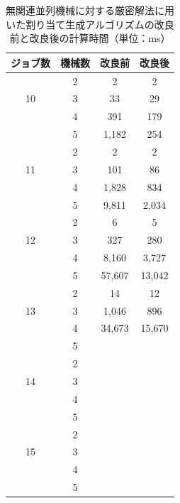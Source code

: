 \documentclass[12pt]{optlab-bachelor}
\begin{document}
\begin{table}[htb]
  \begin{center}
    \begin{tabular}{|c|c|c|c|} \hline
      ジョブ数 & 機械数 & 改良前 & 改良後 \\ \hline \hline
      & 2 & 2 & 2  \\ \cline{2-4}
      10 & 3 & 33 & 29  \\ \cline{2-4}
      & 4 & 391 & 179 \\ \cline{2-4}
      & 5 & 1,182 & 254  \\ \hline \hline
      & 2 & 2 & 2  \\ \cline{2-4}
      11 & 3 & 101 & 86 \\ \cline{2-4}
      & 4 & 1,828 & 834  \\ \cline{2-4}
      & 5 & 9,811 &  2,034 \\ \hline \hline
      & 2 & 6 & 5  \\ \cline{2-4}
      12 & 3 & 327 & 280  \\ \cline{2-4}
      & 4 & 8,160 & 3,727 \\ \cline{2-4}
      & 5 & 57,607 & 13,042 \\ \hline \hline
      & 2 & 14 & 12 \\ \cline{2-4}
      13 & 3 & 1,046 & 896 \\ \cline{2-4}
      & 4 & 34,673 & 15,670 \\ \cline{2-4}
      & 5 &  &  \\ \hline \hline
      & 2 &  &  \\ \cline{2-4}
      14 & 3 &  &  \\ \cline{2-4}
      & 4 &  &  \\ \cline{2-4}
      & 5 &  &   \\ \hline \hline
      & 2 &  &  \\ \cline{2-4}
      15 & 3 &  &  \\ \cline{2-4}
      & 4 &  &  \\ \cline{2-4}
      & 5 &  &   \\ \hline \hline
    \end{tabular}
    \caption{無関連並列機械に対する厳密解法に用いた割り当て生成アルゴリズムの改良前と改良後の計算時間（単位：ms）}
    \label{A3}
  \end{center}
\end{table}
\end{document}
